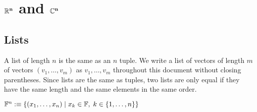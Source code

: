 \section{\texorpdfstring{$\mathbf{\mathbb{R}^n}$}{R^n} and \texorpdfstring{$\mathbf{\mathbb{C}^n}$}{C^n}}

\subsection{Lists}
\setcounter{thm}{7}
\begin{mydef} 
  A list of length $n$ is the same as an $n$ tuple. We write a list of vectors of length $m$ of vectors $(v_1, \ldots, v_m)$ as $v_1, \ldots, v_m$ throughout this document without closing parentheses.
  Since lists are the same as tuples, two lists are only equal if they have the same length and the same elements in the same order.
\end{mydef}

\setcounter{thm}{10}
\begin{mydef} 
  $\mathbb{F}^n :\equiv \left \{ (x_1, \dots, x_n) \mid x_k \in \mathbb{F}, \; k \in \{1, \dots, n\} \right \}$
\end{mydef}